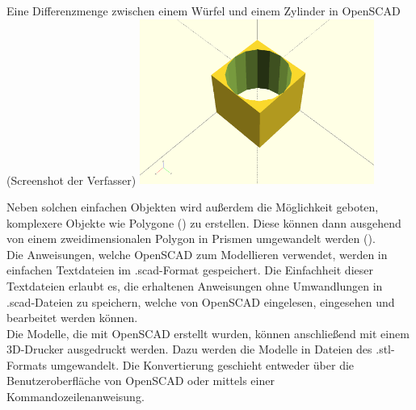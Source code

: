 \begin{Bild}{Eine Differenzmenge zwischen einem Würfel und einem Zylinder in OpenSCAD (Screenshot der Verfasser)}
	\includegraphics[width= 290px]{Bilder/OpenSCAD_Example}
\end{Bild}

Neben solchen einfachen Objekten wird außerdem die Möglichkeit geboten, komplexere Objekte wie Polygone () zu erstellen.
Diese können dann ausgehend von einem zweidimensionalen Polygon in Prismen umgewandelt werden (). \\
Die Anweisungen, welche OpenSCAD zum Modellieren verwendet, werden in einfachen Textdateien im .scad-Format gespeichert.
Die Einfachheit dieser Textdateien erlaubt es, die erhaltenen Anweisungen ohne Umwandlungen in .scad-Dateien zu speichern, welche von OpenSCAD eingelesen, eingesehen und bearbeitet werden können. \\
Die Modelle, die mit OpenSCAD erstellt wurden, können anschließend mit einem 3D-Drucker ausgedruckt werden.
Dazu werden die Modelle in Dateien des .stl-Formats umgewandelt.
Die Konvertierung geschieht entweder über die Benutzeroberfläche von OpenSCAD oder mittels einer Kommandozeilenanweisung.

